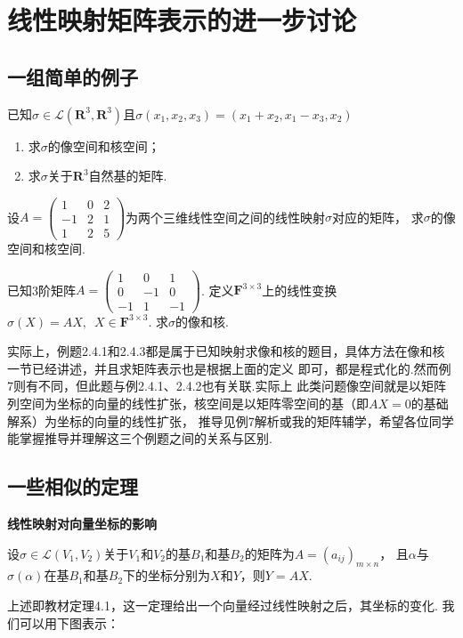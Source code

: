 \section{线性映射矩阵表示的进一步讨论}
\subsection{一组简单的例子}
\begin{example}\label{example:5:矩阵表示1}
    已知$\sigma \in \mathcal{L}(\mathbf{R}^3,\mathbf{R}^3)$且$\sigma(x_1,x_2,x_3)=(x_1+x_2,x_1-x_3, x_2)$
    \begin{enumerate}[label=(\arabic*)]
        \item 求$\sigma$的像空间和核空间；

        \item 求$\sigma$关于$\mathbf{R}^3$自然基的矩阵.
    \end{enumerate}
\end{example}

\begin{example}\label{ex:6:矩阵表示2}
    设$A=\begin{pmatrix}1 & 0 & 2 \\ -1 & 2 & 1 \\ 1 & 2 & 5\end{pmatrix}$为两个三维线性空间之间的线性映射$\sigma$对应的矩阵，
    求$\sigma$的像空间和核空间.
\end{example}

\begin{example}\label{ex:6:矩阵表示3}
    已知3阶矩阵$A=\begin{pmatrix}
        1 & 0 & 1 \\ 0 & -1 & 0 \\ -1 & 1 & -1
    \end{pmatrix}$. 定义$\mathbf{F}^{3 \times 3}$上的线性变换$\sigma(X)=AX,\enspace X \in \mathbf{F}^{3 \times 3}$.
    求$\sigma$的像和核.
\end{example}
实际上，例题2.4.1和2.4.3都是属于已知映射求像和核的题目，具体方法在像和核一节已经讲述，并且求矩阵表示也是根据上面的定义
即可，都是程式化的.然而例7则有不同，但此题与例2.4.1、2.4.2也有关联.实际上
此类问题像空间就是以矩阵列空间为坐标的向量的线性扩张，核空间是以矩阵零空间的基（即$AX=0$的基础解系）为坐标的向量的线性扩张，
推导见例7解析或我的矩阵辅学，希望各位同学能掌握推导并理解这三个例题之间的关系与区别. %

\subsection{一些相似的定理}
\begin{theorem} \label{thm:6:线性映射对向量坐标的影响}
    \textbf{\heiti 线性映射对向量坐标的影响}

    设$\sigma \in \mathcal{L}(V_1,V_2)$关于$V_1$和$V_2$的基$B_1$和基$B_2$的矩阵为$A=(a_{ij})_{m \times n}$，
    且$\alpha$与$\sigma(\alpha)$在基$B_1$和基$B_2$下的坐标分别为$X$和$Y$，则$Y=AX$.
\end{theorem}
上述即教材定理4.1，这一定理给出一个向量经过线性映射之后，其坐标的变化. 我们可以用下图表示：

